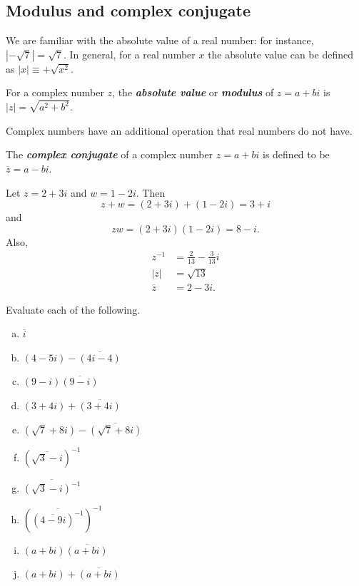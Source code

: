 \subsection{Modulus and complex conjugate}

We are familiar with the absolute value of a real number: for instance,
$|-\sqrt{7}|=\sqrt{7}$. In general, for a real number $x$ the absolute
value can be defined as $|x|\equiv+\sqrt{x^{2}}$.

\begin{defn}
For a complex number $z$, the \textbf{\emph{absolute value}} or \textbf{\emph{modulus}}
of $z=a+bi$ is $|z|=\sqrt{a^{2}+b^{2}}$.
\end{defn}

Complex numbers have an additional operation that real numbers do
not have. 

\begin{defn}
The \textbf{\emph{complex conjugate}}
of a complex number $z=a+bi$ is defined to be $\overline{z}=a-bi$.
\end{defn}

\begin{example}\label{example:complex:complexadd} Let $z=2+3i$ and $w=1-2i$. Then \[
z+w=(2+3i)+(1-2i)=3+i\]
 and \[
zw=(2+3i)(1-2i)=8-i.\]
 Also, \begin{align*}
z^{-1} & =\frac{2}{13}-\frac{3}{13}i\\
|z| & =\sqrt{13}\\
\overline{z} & =2-3i.\end{align*}
 \end{example}
 \medskip

\begin{exercise}\label{exercise:complex:18}
Evaluate each of the following.
\begin{multicols}{2}
\begin{enumerate}[(a)]
\item
$\overline{i}$
\item
 $(4-5i)-\overline{(4i -4)}$
\item
$(9-i) \overline{(9-i)}$
\item
$(3+4i)+\overline{(3+4i)}$
\item
$(\sqrt{7}+8i)-\overline{(\sqrt{7}+8i)}$
\item 
$\left({\overline{\sqrt{3} -i}}\right)^{-1}$
\item 
$\overline{\left(\sqrt{3} -i\right)^{-1}}$
\item 
$\left( \overline{\left({\overline{4 -9i}}\right)^{-1}} \right) ^{-1}$
\item
$(a + bi)\overline{(a+bi)}$
\item
$(a + bi) + \overline{(a+bi)}$
\end{enumerate}
\end{multicols}
\end{exercise}

